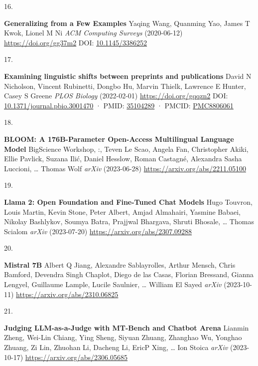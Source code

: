 \documentclass[
]{article}
\newlength{\cslhangindent}
\newlength{\csllabelwidth}
\newlength{\cslentryspacingunit} %
\newenvironment{CSLReferences}[2] %
 {%
  \setlength{\parindent}{0pt}
  \ifodd #1
  \let\oldpar\par
  \def\par{\hangindent=\cslhangindent\oldpar}
  \fi
  \setlength{\parskip}{#2\cslentryspacingunit}
 }%
 {}
\newcommand{\CSLBlock}[1]{#1\hfill\break}
\newcommand{\CSLLeftMargin}[1]{\parbox[t]{\csllabelwidth}{#1}}
\newcommand{\CSLRightInline}[1]{\parbox[t]{\linewidth - \csllabelwidth}{#1}\break}
\begin{document}
\begin{CSLReferences}{0}{0}
\leavevmode{}%
\CSLLeftMargin{16. }%
\CSLRightInline{\textbf{Generalizing from a Few Examples}
\CSLBlock{Yaqing Wang, Quanming Yao, James T Kwok, Lionel M Ni} \emph{ACM Computing Surveys} (2020-06-12) \url{https://doi.org/gg37m2}
\CSLBlock{DOI: \href{https://doi.org/10.1145/3386252}{10.1145/3386252}}}

\leavevmode{}%
\CSLLeftMargin{17. }%
\CSLRightInline{\textbf{Examining linguistic shifts between preprints and publications}
\CSLBlock{David N Nicholson, Vincent Rubinetti, Dongbo Hu, Marvin Thielk, Lawrence E Hunter, Casey S Greene} \emph{PLOS Biology} (2022-02-01) \url{https://doi.org/gqqzn2}
\CSLBlock{DOI: \href{https://doi.org/10.1371/journal.pbio.3001470}{10.1371/journal.pbio.3001470} · PMID: \href{https://www.ncbi.nlm.nih.gov/pubmed/35104289}{35104289} · PMCID: \href{https://www.ncbi.nlm.nih.gov/pmc/articles/PMC8806061}{PMC8806061}}}

\leavevmode{}%
\CSLLeftMargin{18. }%
\CSLRightInline{\textbf{BLOOM: A 176B-Parameter Open-Access Multilingual Language Model}
\CSLBlock{BigScience Workshop, :, Teven Le Scao, Angela Fan, Christopher Akiki, Ellie Pavlick, Suzana Ilić, Daniel Hesslow, Roman Castagné, Alexandra Sasha Luccioni, \ldots{} Thomas Wolf} \emph{arXiv} (2023-06-28) \url{https://arxiv.org/abs/2211.05100}}

\leavevmode{}%
\CSLLeftMargin{19. }%
\CSLRightInline{\textbf{Llama 2: Open Foundation and Fine-Tuned Chat Models}
\CSLBlock{Hugo Touvron, Louis Martin, Kevin Stone, Peter Albert, Amjad Almahairi, Yasmine Babaei, Nikolay Bashlykov, Soumya Batra, Prajjwal Bhargava, Shruti Bhosale, \ldots{} Thomas Scialom} \emph{arXiv} (2023-07-20) \url{https://arxiv.org/abs/2307.09288}}

\leavevmode{}%
\CSLLeftMargin{20. }%
\CSLRightInline{\textbf{Mistral 7B}
\CSLBlock{Albert Q Jiang, Alexandre Sablayrolles, Arthur Mensch, Chris Bamford, Devendra Singh Chaplot, Diego de las Casas, Florian Bressand, Gianna Lengyel, Guillaume Lample, Lucile Saulnier, \ldots{} William El Sayed} \emph{arXiv} (2023-10-11) \url{https://arxiv.org/abs/2310.06825}}

\leavevmode{}%
\CSLLeftMargin{21. }%
\CSLRightInline{\textbf{Judging LLM-as-a-Judge with MT-Bench and Chatbot Arena}
\CSLBlock{Lianmin Zheng, Wei-Lin Chiang, Ying Sheng, Siyuan Zhuang, Zhanghao Wu, Yonghao Zhuang, Zi Lin, Zhuohan Li, Dacheng Li, EricP Xing, \ldots{} Ion Stoica} \emph{arXiv} (2023-10-17) \url{https://arxiv.org/abs/2306.05685}}


\end{CSLReferences}
\end{document}
